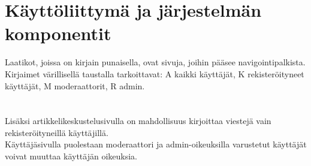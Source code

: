 \documentclass[12pt]{article}
\begin{document}
  \section{Käyttöliittymä ja järjestelmän komponentit}
        Laatikot, joissa on kirjain punaisella, ovat sivuja, joihin pääsee navigointipalkista.
        Kirjaimet värillisellä taustalla tarkoittavat: A kaikki käyttäjät, K rekisteröityneet käyttäjät, M moderaattorit, R admin. \\
         \\ \\
        Lisäksi artikkelikeskustelusivulla on mahdollisuus kirjoittaa viestejä vain rekisteröityneillä käyttäjillä.\\
        Käyttäjäsivulla puolestaan moderaattori ja admin-oikeuksilla varustetut käyttäjät voivat muuttaa käyttäjän oikeuksia. \\
        
        
\end{document}
